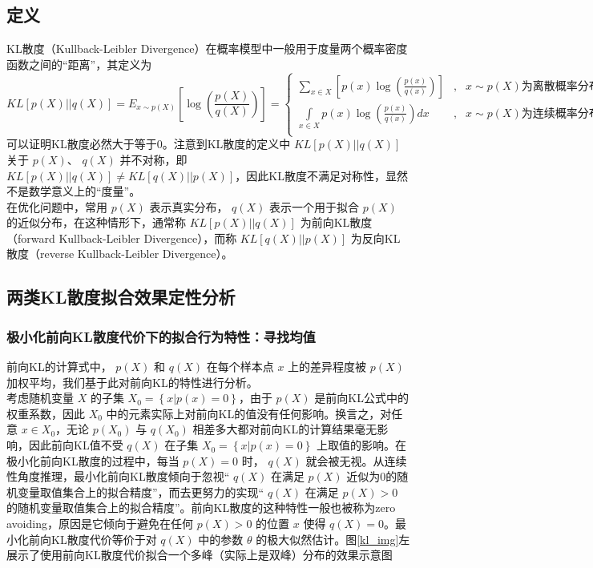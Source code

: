 \documentclass[12pt,a4paper,UTF8]{article}
\begin{document}
\subsection{定义}
\indent KL散度（Kullback-Leibler Divergence）在概率模型中一般用于度量两个概率密度函数之间的“距离”，其定义为
\[KL\left[p\left(X\right)||q\left(X\right)\right]=E_{x\sim p\left(X\right)}\left[\log\left(\frac{p\left(X\right)}{q\left(X\right)}\right)\right]=\left\{
\begin{matrix}
\sum\limits_{x\in X}\left[p\left(x\right)\log\left(\frac{p\left(x\right)}{q\left(x\right)}\right)\right]&,&x\sim p\left(X\right)\text{为离散概率分布}\\
\int\limits_{x\in X}p\left(x\right)\log\left(\frac{p\left(x\right)}{q\left(x\right)}\right)dx&,&x\sim p\left(X\right)\text{为连续概率分布}\\
\end{matrix}
\right.\]
可以证明KL散度必然大于等于0。注意到KL散度的定义中 $KL\left[p\left(X\right)||q\left(X\right)\right]$ 关于 $p\left(X\right)$、 $q\left(X\right)$ 并不对称，即 $KL\left[p\left(X\right)||q\left(X\right)\right]\neq KL\left[q\left(X\right)||p\left(X\right)\right]$，因此KL散度不满足对称性，显然不是数学意义上的“度量”。\\
\indent 在优化问题中，常用 $p\left(X\right)$ 表示真实分布， $q\left(X\right)$ 表示一个用于拟合 $p\left(X\right)$ 的近似分布，在这种情形下，通常称 $KL\left[p\left(X\right)||q\left(X\right)\right]$ 为前向KL散度（forward Kullback-Leibler Divergence），而称 $KL\left[q\left(X\right)||p\left(X\right)\right]$ 为反向KL散度（reverse Kullback-Leibler Divergence）。

\subsection{两类KL散度拟合效果定性分析}
\subsubsection{极小化前向KL散度代价下的拟合行为特性：寻找均值}
\indent 前向KL的计算式中， $p\left(X\right)$ 和 $q\left(X\right)$ 在每个样本点 $x$ 上的差异程度被 $p\left(X\right)$ 加权平均，我们基于此对前向KL的特性进行分析。\\
\indent 考虑随机变量 $X$ 的子集 $X_0=\left\{x|p\left(x\right)=0\right\}$，由于 $p\left(X\right)$ 是前向KL公式中的权重系数，因此 $X_0$ 中的元素实际上对前向KL的值没有任何影响。换言之，对任意 $x\in X_0$，无论 $p\left(X_0\right)$ 与 $q\left(X_0\right)$ 相差多大都对前向KL的计算结果毫无影响，因此前向KL值不受 $q\left(X\right)$ 在子集 $X_0=\left\{x|p\left(x\right)=0\right\}$ 上取值的影响。在极小化前向KL散度的过程中，每当 $p\left(X\right)=0$ 时， $q\left(X\right)$ 就会被无视。从连续性角度推理，最小化前向KL散度倾向于忽视“ $q\left(X\right)$ 在满足 $p\left(X\right)$ 近似为0的随机变量取值集合上的拟合精度”，而去更努力的实现“ $q\left(X\right)$ 在满足 $p\left(X\right)>0$ 的随机变量取值集合上的拟合精度”。前向KL散度的这种特性一般也被称为zero avoiding，原因是它倾向于避免在任何 $p\left(X\right)>0$ 的位置 $x$ 使得 $q\left(X\right)=0$。最小化前向KL散度代价等价于对 $q\left(X\right)$ 中的参数 $\theta$ 的极大似然估计。图\ref{kl_img}左展示了使用前向KL散度代价拟合一个多峰（实际上是双峰）分布的效果示意图
\end{document}
